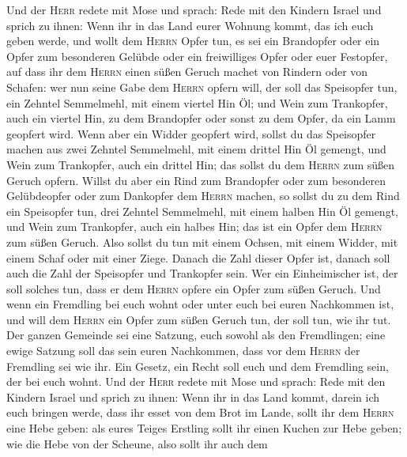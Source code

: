  Und der \textsc{Herr} redete mit Mose und sprach:
 Rede mit den Kindern Israel und sprich zu ihnen: Wenn ihr
in das Land eurer Wohnung kommt, das ich euch geben werde,
 und wollt dem \textsc{Herrn} Opfer tun, es sei ein
Brandopfer oder ein Opfer zum besonderen Gelübde oder ein freiwilliges
Opfer oder euer Festopfer, auf dass ihr dem \textsc{Herrn} einen süßen
Geruch machet von Rindern oder von Schafen:  wer nun seine
Gabe dem \textsc{Herrn} opfern will, der soll das Speisopfer tun, ein
Zehntel Semmelmehl, mit einem viertel Hin Öl;  und Wein
zum Trankopfer, auch ein viertel Hin, zu dem Brandopfer oder sonst zu
dem Opfer, da ein Lamm geopfert wird.  Wenn aber ein
Widder geopfert wird, sollst du das Speisopfer machen aus zwei Zehntel
Semmelmehl, mit einem drittel Hin Öl gemengt,  und Wein
zum Trankopfer, auch ein drittel Hin; das sollst du dem \textsc{Herrn}
zum süßen Geruch opfern.  Willst du aber ein Rind zum
Brandopfer oder zum besonderen Gelübdeopfer oder zum Dankopfer dem
\textsc{Herrn} machen,  so sollst du zu dem Rind ein
Speisopfer tun, drei Zehntel Semmelmehl, mit einem halben Hin Öl
gemengt,  und Wein zum Trankopfer, auch ein halbes Hin;
das ist ein Opfer dem \textsc{Herrn} zum süßen Geruch. 
Also sollst du tun mit einem Ochsen, mit einem Widder, mit einem Schaf
oder mit einer Ziege.  Danach die Zahl dieser Opfer ist,
danach soll auch die Zahl der Speisopfer und Trankopfer sein.
 Wer ein Einheimischer ist, der soll solches tun, dass er
dem \textsc{Herrn} opfere ein Opfer zum süßen Geruch. 
Und wenn ein Fremdling bei euch wohnt oder unter euch bei euren
Nachkommen ist, und will dem \textsc{Herrn} ein Opfer zum süßen Geruch
tun, der soll tun, wie ihr tut.  Der ganzen Gemeinde sei
eine Satzung, euch sowohl als den Fremdlingen; eine ewige Satzung soll
das sein euren Nachkommen, dass vor dem \textsc{Herrn} der Fremdling sei
wie ihr.  Ein Gesetz, ein Recht soll euch und dem
Fremdling sein, der bei euch wohnt.  Und der
\textsc{Herr} redete mit Mose und sprach:  Rede mit den
Kindern Israel und sprich zu ihnen: Wenn ihr in das Land kommt, darein
ich euch bringen werde,  dass ihr esset von dem Brot im
Lande, sollt ihr dem \textsc{Herrn} eine Hebe geben:  als
eures Teiges Erstling sollt ihr einen Kuchen zur Hebe geben; wie die
Hebe von der Scheune,  also sollt ihr auch dem
